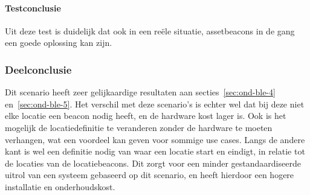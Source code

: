 \paragraph{Testconclusie}
Uit deze test is duidelijk dat ook in een reële situatie, assetbeacons in de gang een goede oplossing kan zijn.

\subsubsection{Deelconclusie}
Dit scenario heeft zeer gelijkaardige resultaten aan secties~\ref{sec:ond-ble-4} en~\ref{sec:ond-ble-5}. Het verschil met deze scenario's is echter wel dat bij deze niet elke locatie een beacon nodig heeft, en de hardware kost lager is. Ook is het mogelijk de locatiedefinitie te veranderen zonder de hardware te moeten verhangen, wat een voordeel kan geven voor sommige use cases. Langs de andere kant is wel een definitie nodig van waar een locatie start en eindigt, in relatie tot de locaties van de locatiebeacons. Dit zorgt voor een minder gestandaardiseerde uitrol van een systeem gebaseerd op dit scenario, en heeft hierdoor een hogere installatie en onderhoudskost.
